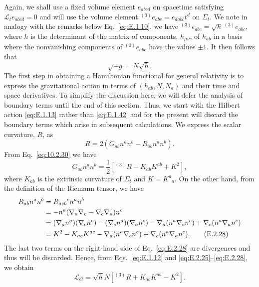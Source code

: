 Again, we shall use a fixed volume element \(e_{abcd}\) on spacetime satisfying
\(\mathcal L_t e_{abcd}=0\) and will use the volume element
\({}^{(3)}e_{abc}=e_{dabc}t^d\) on \(\Sigma_t\). We note in analogy with the
remarks below Eq.~\eqref{eq:E.1.10}, we have
\({}^{(3)}\epsilon_{abc}=\sqrt{h}\,{}^{(3)}e_{abc}\), where \(h\) is the
determinant of the matrix of components, \(h_{\mu\nu}\), of \(h_{ab}\) in a basis
where the nonvanishing components of \({}^{(3)}e_{abc}\) have the values \(\pm1\).
It then follows that
\begin{equation}
  \sqrt{-g}=N\sqrt{h}.
  \tag{E.2.25}\label{eq:E.2.25}
\end{equation}
The first step in obtaining a Hamiltonian functional for general relativity is to
express the gravitational action in terms of \((h_{ab},N,N_a)\) and their time and
space derivatives. To simplify the discussion here, we will defer the analysis of
boundary terms until the end of this section. Thus, we start with the Hilbert action
\eqref{eq:E.1.13} rather than \eqref{eq:E.1.42} and for the present will discard the
boundary terms which arise in subsequent calculations. We express the scalar
curvature, \(R\), as
\begin{equation}
  R=2(G_{ab}n^an^b-R_{ab}n^an^b).
  \tag{E.2.26}\label{eq:E.2.26}
\end{equation}
From Eq.~\eqref{eq:10.2.30} we have
\begin{equation}
  G_{ab}n^an^b
    =\frac{1}{2}\left[{}^{(3)}R-K_{ab}K^{ab}+K^2\right],
  \tag{E.2.27}\label{eq:E.2.27}
\end{equation}
where \(K_{ab}\) is the extrinsic curvature of \(\Sigma_t\) and \(K=K^a{}_a\). On
the other hand, from the definition of the Riemann tensor, we have
\begin{align}
  R_{ab}n^an^b
    &=R_{acb}{}^c n^an^b\notag\\
    &=-n^a(\nabla_a\nabla_c-\nabla_c\nabla_a)n^c\notag\\
    &=(\nabla_an^a)(\nabla_cn^c)-(\nabla_cn^a)(\nabla_an^c)
      -\nabla_a(n^a\nabla_cn^c)+\nabla_c(n^a\nabla_an^c)\notag\\
    &=K^2-K_{ac}K^{ac}-\nabla_a(n^a\nabla_cn^c)
      +\nabla_c(n^a\nabla_an^c).
  \tag{E.2.28}\label{eq:E.2.28}
\end{align}
The last two terms on the right-hand side of Eq.~\eqref{eq:E.2.28} are divergences
and thus will be discarded. Hence, from Eqs.~\eqref{eq:E.1.12} and
\eqref{eq:E.2.25}--\eqref{eq:E.2.28}, we obtain
\begin{equation}
  \mathcal L_G=\sqrt{h}N\left[{}^{(3)}R+K_{ab}K^{ab}-K^2\right].
  \tag{E.2.29}\label{eq:E.2.29}
\end{equation}
